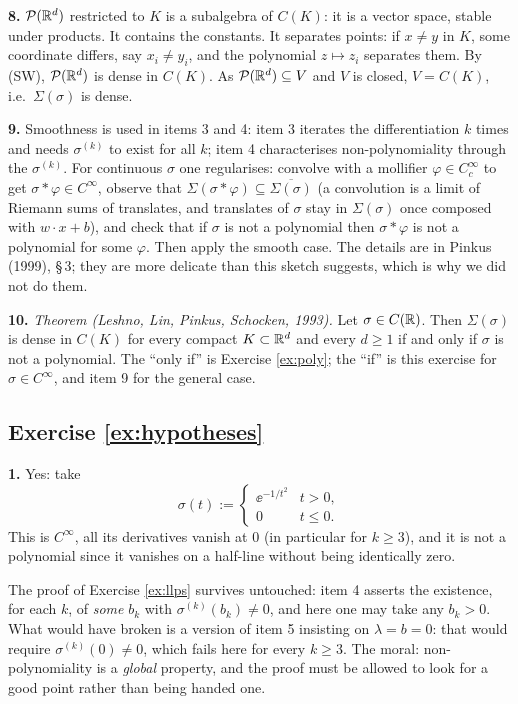 \documentclass[11pt,a4paper]{article}
\begin{document}
\textbf{8.} $\mathcal{P}(\mathbb{R}^d)$ restricted to $K$ is a subalgebra of $C(K)$: it is a vector space, stable
under products. It contains the constants. It separates points: if $x\ne y$ in $K$, some coordinate
differs, say $x_i\ne y_i$, and the polynomial $z\mapsto z_i$ separates them. By (SW), $\mathcal{P}(\mathbb{R}^d)$ is
dense in $C(K)$. As $\mathcal{P}(\mathbb{R}^d)\subseteq V$ and $V$ is closed, $V = C(K)$, i.e.\ $\Sigma(\sigma)$ is
dense.

\textbf{9.} Smoothness is used in items 3 and 4: item 3 iterates the differentiation $k$ times and
needs $\sigma^{(k)}$ to exist for all $k$; item 4 characterises non-polynomiality through the
$\sigma^{(k)}$. For continuous $\sigma$ one regularises: convolve with a mollifier
$\varphi\in C_c^\infty$ to get $\sigma*\varphi\in C^\infty$, observe that
$\Sigma(\sigma*\varphi)\subseteq\overline{\Sigma(\sigma)}$ (a convolution is a limit of Riemann sums
of translates, and translates of $\sigma$ stay in $\Sigma(\sigma)$ once composed with $w\cdot x+b$),
and check that if $\sigma$ is not a polynomial then $\sigma*\varphi$ is not a polynomial for some
$\varphi$. Then apply the smooth case. The details are in Pinkus (1999), §\,3; they are more
delicate than this sketch suggests, which is why we did not do them.

\textbf{10.} \emph{Theorem (Leshno, Lin, Pinkus, Schocken, 1993).} Let $\sigma\in C(\mathbb{R})$. Then
$\Sigma(\sigma)$ is dense in $C(K)$ for every compact $K\subset\mathbb{R}^d$ and every $d\ge1$ if and only
if $\sigma$ is not a polynomial. The ``only if'' is Exercise \ref{ex:poly}; the ``if'' is this
exercise for $\sigma\in C^\infty$, and item 9 for the general case.

\subsection*{Exercise \ref{ex:hypotheses}}

\textbf{1.} Yes: take
\[
\sigma(t) := \begin{cases} \ee^{-1/t^2} & t > 0,\\ 0 & t\le 0.\end{cases}
\]
This is $C^\infty$, all its derivatives vanish at $0$ (in particular for $k\ge3$), and it is not a
polynomial since it vanishes on a half-line without being identically zero.

The proof of Exercise \ref{ex:llps} survives untouched: item 4 asserts the existence, for each $k$,
of \emph{some} $b_k$ with $\sigma^{(k)}(b_k)\ne0$, and here one may take any $b_k>0$. What would
have broken is a version of item 5 insisting on $\lambda = b = 0$: that would require
$\sigma^{(k)}(0)\ne0$, which fails here for every $k\ge3$. The moral: non-polynomiality is a
\emph{global} property, and the proof must be allowed to look for a good point rather than being
handed one.
\end{document}
